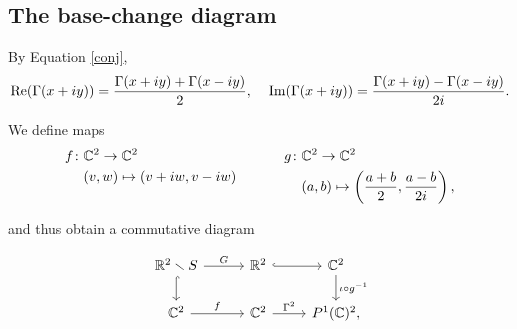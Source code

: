 \documentclass[11pt,reqno]{amsart}
\newtheorem{lemma}[theorem]{Lemma}
\theoremstyle{definition}
\numberwithin{equation}{section}
\renewcommand{\Im}{\mathrm{Im}}
\renewcommand{\Pr}{\mathbb{P}}
\renewcommand{\Re}{\mathrm{Re}}
\begin{document}

\subsection{The base-change diagram}

By Equation \eqref{conj}, 
$$
\Re (\Gamma(x+iy)) = \frac{\Gamma(x+iy)+\Gamma(x-iy)}{2}, \hspace{4mm} \Im (\Gamma(x+iy))=  \frac{\Gamma(x+iy)-\Gamma(x-iy)}{2i}. 
$$

We define maps 
\begin{equation*}
\begin{aligned}[t]
  f\colon & \mathbb C^2  \rightarrow \mathbb C^2 \\ & (v, w) \mapsto (v+iw, v-iw)
\end{aligned}
\quad \hspace{5mm} \quad
\begin{aligned}[t]
  g \colon & \mathbb C^2  \rightarrow \mathbb C^2 \\
 & (a, b) \mapsto \left ( \frac{a+b}{2}, \frac{a-b}{2i} \right ),
\end{aligned}
\end{equation*}

and thus obtain a commutative diagram 

\begin{center}
\begin{equation} \label{commdiagram}
\begin{tikzcd}
 \mathbb R^2  \smallsetminus S \arrow[r, "G"] \arrow[hookrightarrow, d] &[0.5em] \mathbb R^2 \arrow[hookrightarrow, r] & \mathbb C^2 \arrow[d, "\iota \circ g^{-1}"]\\
\mathbb C^2 \arrow[r, "f"]  & \mathbb C^2 \arrow[r, "\Gamma^2"] & \mathbb \Pr^1(\mathbb C)^2, 
\end{tikzcd}
\end{equation}
\end{center}
\end{document}

